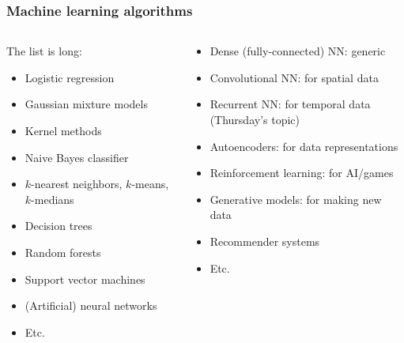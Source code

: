 \begin{frame}
    \frametitle{Machine learning algorithms}

    \begin{columns}
        \begin{column}{0.44\textwidth}
            The list is long:
            \begin{itemize}[<.->]
                \item Logistic regression
                \item Gaussian mixture models
                \item Kernel methods
                \item Naive Bayes classifier
                \item $k$-nearest neighbors, $k$-means, $k$-medians
                \item Decision trees
                \item Random forests
                \item Support vector machines
                \item \alert<2->{(Artificial) neural networks}
                \item Etc.
            \end{itemize}
        \end{column}

        \begin{column}{0.56\textwidth}
            \begin{itemize}[<2->]
                \item \alert<3->{Dense (fully-connected) NN: generic}
                \item Convolutional NN: for spatial data
                \item \alert<3->{Recurrent NN: for temporal data (Thursday's topic)}
                \item Autoencoders: for data representations
                \item Reinforcement learning: for AI/games
                \item Generative models: for making new data
                \item Recommender systems
                \item Etc.
            \end{itemize}
        \end{column}
    \end{columns}
\end{frame}

